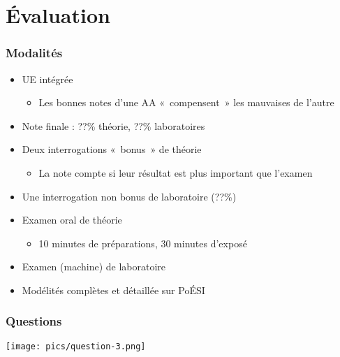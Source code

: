 \section{Évaluation}

\begin{frame}
\frametitle{Modalités}
\begin{itemize}[<+->]
\item UE intégrée
	\begin{itemize}
	\item Les bonnes notes d'une AA «~compensent~» les mauvaises de l'autre
	\end{itemize}
\item Note finale : ??\% théorie, ??\% laboratoires
\item Deux interrogations «~bonus~» de théorie
	\begin{itemize}
	\item La note compte si leur résultat est plus important que l'examen
	\end{itemize}
\item Une interrogation non bonus de laboratoire (??\%)
\item Examen oral de théorie
	\begin{itemize}
	\item 10 minutes de préparations, 30 minutes d'exposé
	\end{itemize}
\item Examen (machine) de laboratoire
\item Modélités complètes et détaillée sur PoÉSI
\end{itemize}
\end{frame}

\begin{frame}
\frametitle{Questions}
\begin{center}
\texttt{[image: pics/question-3.png]}
\end{center}
\end{frame}


